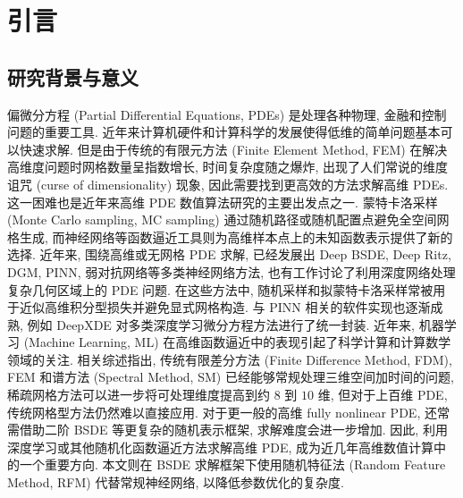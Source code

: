 
\chapter{引言}\label{ch:introduction}
  \section{研究背景与意义}\label{sec:background}
    偏微分方程 (Partial Differential Equations, PDEs) 是处理各种物理, 金融和控制问题的重要工具.
    近年来计算机硬件和计算科学的发展使得低维的简单问题基本可以快速求解.
    但是由于传统的有限元方法 (Finite Element Method, FEM) 在解决高维度问题时网格数量呈指数增长, 时间复杂度随之爆炸,
    出现了人们常说的维度诅咒 (curse of dimensionality) 现象, 因此需要找到更高效的方法求解高维 PDEs.
    这一困难也是近年来高维 PDE 数值算法研究的主要出发点之一\cite{hanSolvingHighdimensionalPartial2018,eAlgorithmsSolvingHigh2022}.
    蒙特卡洛采样 (Monte Carlo sampling, MC sampling) 通过随机路径或随机配置点避免全空间网格生成,
    而神经网络等函数逼近工具则为高维样本点上的未知函数表示提供了新的选择.
    近年来, 围绕高维或无网格 PDE 求解, 已经发展出 Deep BSDE, Deep Ritz, DGM, PINN, 弱对抗网络等多类神经网络方法,
    也有工作讨论了利用深度网络处理复杂几何区域上的 PDE 问题\cite{eDeepRitzMethod2018,sirignanoDGMDeepLearning2018,raissiPhysicsinformedNeuralNetworks2019,bergUnifiedDeepArtificial2018,zangWeakAdversarialNetworks2020}.
    在这些方法中, 随机采样和拟蒙特卡洛采样常被用于近似高维积分型损失并避免显式网格构造\cite{kuoQUASIMONTECARLOMETHODS2011,chenQuasiMonteCarloSampling2021,huTacklingCurseDimensionality2024}.
    与 PINN 相关的软件实现也逐渐成熟, 例如 DeepXDE 对多类深度学习微分方程方法进行了统一封装\cite{luDeepXDEDeepLearning2021}.
    近年来, 机器学习 (Machine Learning, ML) 在高维函数逼近中的表现引起了科学计算和计算数学领域的关注.
    相关综述指出,
    传统有限差分方法 (Finite Difference Method, FDM), FEM 和谱方法 (Spectral Method, SM)
    已经能够常规处理三维空间加时间的问题,
    稀疏网格方法可以进一步将可处理维度提高到约 $8$ 到 $10$ 维,
    但对于上百维 PDE, 传统网格型方法仍然难以直接应用\cite{eMachineLearningComputational2020}.
    对于更一般的高维 fully nonlinear PDE, 还常需借助二阶 BSDE 等更复杂的随机表示框架, 求解难度会进一步增加\cite{beckMachineLearningApproximation2019}.
    因此, 利用深度学习或其他随机化函数逼近方法求解高维 PDE,
    成为近几年高维数值计算中的一个重要方向.
    本文则在 BSDE 求解框架下使用随机特征法 (Random Feature Method, RFM) 代替常规神经网络,
    以降低参数优化的复杂度.

